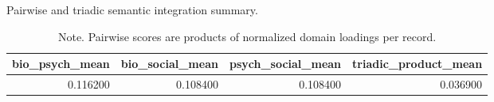 \begin{table}[htbp]
\raggedright
\caption{Pairwise and triadic semantic integration summary.}
\label{tab.semantic.pairwise.summary}
\begin{tabular}{rrrr}
\toprule
bio\_psych\_mean & bio\_social\_mean & psych\_social\_mean & triadic\_product\_mean \\
\midrule
0.116200 & 0.108400 & 0.108400 & 0.036900 \\
\bottomrule
\end{tabular}

\caption*{Note. Pairwise scores are products of normalized domain loadings per record.}
\end{table}
